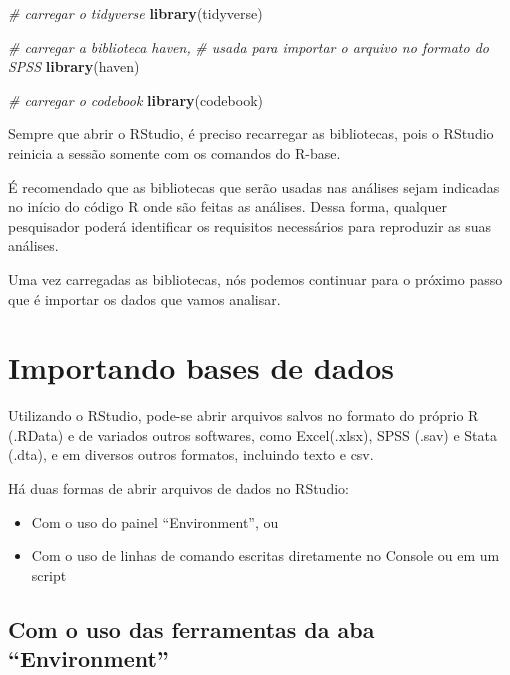\documentclass[
  10pt,
  brazil,
  a4paper,
  twoside, notitlepage, openright]{book}
\newenvironment{Shaded}{\begin{snugshade}}{\end{snugshade}}
\newcommand{\CommentTok}[1]{\textcolor[rgb]{0.56,0.35,0.01}{\textit{#1}}}
\newcommand{\KeywordTok}[1]{\textcolor[rgb]{0.13,0.29,0.53}{\textbf{#1}}}
\newcommand{\NormalTok}[1]{#1}
\providecommand{\tightlist}{%
  \setlength{\itemsep}{0pt}\setlength{\parskip}{0pt}}
\begin{document}
\begin{Shaded}
\begin{Highlighting}[]
\CommentTok{# carregar o tidyverse}
\KeywordTok{library}\NormalTok{(tidyverse)}

\CommentTok{# carregar a biblioteca haven, }
\CommentTok{# usada para importar o arquivo  no formato do SPSS }
\KeywordTok{library}\NormalTok{(haven)}

\CommentTok{# carregar o codebook}
\KeywordTok{library}\NormalTok{(codebook)}
\end{Highlighting}
\end{Shaded}

Sempre que abrir o RStudio, é preciso recarregar as bibliotecas, pois o RStudio reinicia a sessão somente com os comandos do R-base.

É recomendado que as bibliotecas que serão usadas nas análises sejam indicadas no início do código R onde são feitas as análises. Dessa forma, qualquer pesquisador poderá identificar os requisitos necessários para reproduzir as suas análises.

Uma vez carregadas as bibliotecas, nós podemos continuar para o próximo passo que é importar os dados que vamos analisar.

\hypertarget{importando-bases-de-dados}{%
\chapter{Importando bases de dados}\label{importando-bases-de-dados}}

Utilizando o RStudio, pode-se abrir arquivos salvos no formato do próprio R (.RData) e de variados outros softwares, como Excel(.xlsx), SPSS (.sav) e Stata (.dta), e em diversos outros formatos, incluindo texto e csv.

Há duas formas de abrir arquivos de dados no RStudio:

\begin{itemize}
\tightlist
\item
  Com o uso do painel ``Environment'', ou
\item
  Com o uso de linhas de comando escritas diretamente no Console ou em um script
\end{itemize}

\hypertarget{com-o-uso-das-ferramentas-da-aba-environment}{%
\section{Com o uso das ferramentas da aba ``Environment''}\label{com-o-uso-das-ferramentas-da-aba-environment}}
\end{document}
